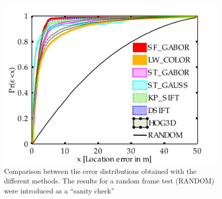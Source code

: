 \begin{figure}
\centering
\includegraphics[width=\textwidth]{./gfx/Chapter04/CDF_Figs/all.pdf}
\caption{Comparison between the error distributions obtained with the different methods. The results for a random frame test (RANDOM) were introduced as a ``sanity check''}
\label{fig:CDFall}
\end{figure}



